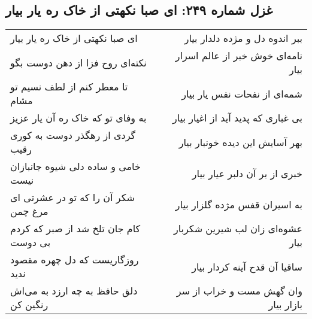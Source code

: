 \begin{center}
\section*{غزل شماره ۲۴۹: ای صبا نکهتی از خاک ره یار بیار}
\label{sec:sh249}
\begin{longtable}{l p{0.5cm} r}
ای صبا نکهتی از خاک ره یار بیار
&&
ببر اندوه دل و مژده دلدار بیار
\\
نکته‌ای روح فزا از دهن دوست بگو
&&
نامه‌ای خوش خبر از عالم اسرار بیار
\\
تا معطر کنم از لطف نسیم تو مشام
&&
شمه‌ای از نفحات نفس یار بیار
\\
به وفای تو که خاک ره آن یار عزیز
&&
بی غباری که پدید آید از اغیار بیار
\\
گردی از رهگذر دوست به کوری رقیب
&&
بهر آسایش این دیده خونبار بیار
\\
خامی و ساده دلی شیوه جانبازان نیست
&&
خبری از بر آن دلبر عیار بیار
\\
شکر آن را که تو در عشرتی ای مرغ چمن
&&
به اسیران قفس مژده گلزار بیار
\\
کام جان تلخ شد از صبر که کردم بی دوست
&&
عشوه‌ای زان لب شیرین شکربار بیار
\\
روزگاریست که دل چهره مقصود ندید
&&
ساقیا آن قدح آینه کردار بیار
\\
دلق حافظ به چه ارزد به می‌اش رنگین کن
&&
وان گهش مست و خراب از سر بازار بیار
\\
\end{longtable}
\end{center}
